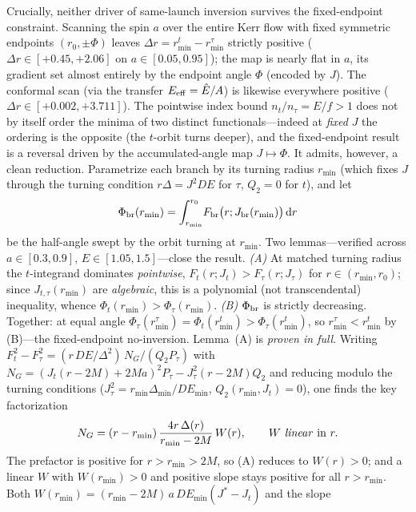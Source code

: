 \documentclass[12pt]{iopart}
\theoremstyle{plain}
\theoremstyle{definition}
\theoremstyle{remark}
\newcommand{\dd}{\mathrm{d}}
\begin{document}
Crucially, neither driver of same-launch inversion survives the
fixed-endpoint constraint. Scanning the spin $a$ over the entire
Kerr flow with fixed symmetric endpoints $(r_0,\pm\Phi)$ leaves
$\Delta r=r_{\min}^t-r_{\min}^\tau$ strictly positive
($\Delta r\in[+0.45,+2.06]$ on $a\in[0.05,0.95]$); the map is nearly flat
in $a$, its gradient set almost entirely by the endpoint angle
$\Phi$ (encoded by $J$). The conformal scan (via the transfer
$E_{\rm eff}=\hat E/A$) is likewise everywhere positive
($\Delta r\in[+0.002,+3.711]$). The pointwise index bound $n_t/n_\tau=E/f>1$ does
not by itself order the minima of two distinct functionals---indeed at \emph{fixed}
$J$ the ordering is the opposite (the $t$-orbit turns deeper), and the fixed-endpoint
result is a reversal driven by the accumulated-angle map $J\mapsto\Phi$. It admits,
however, a clean reduction. Parametrize each branch by its turning radius $r_{\min}$
(which fixes $J$ through the turning condition $r\Delta=J^2 DE$ for $\tau$, $Q_2=0$
for $t$), and let
\begin{equation}
    \Phi_{\rm br}(r_{\min})=\int_{r_{\min}}^{r_0}\!F_{\rm br}\big(r;J_{\rm br}(r_{\min})\big)\,\dd r
\end{equation}
be the half-angle swept by the orbit turning at $r_{\min}$. Two lemmas---verified
across $a\in[0.3,0.9]$, $E\in[1.05,1.5]$---close the result. \emph{(A)} At matched
turning radius the $t$-integrand dominates \emph{pointwise},
$F_t(r;J_t)>F_\tau(r;J_\tau)$ for $r\in(r_{\min},r_0)$; since $J_{t,\tau}(r_{\min})$
are \emph{algebraic}, this is a polynomial (not transcendental) inequality, whence
$\Phi_t(r_{\min})>\Phi_\tau(r_{\min})$. \emph{(B)} $\Phi_{\rm br}$ is strictly
decreasing. Together: at equal angle
$\Phi_\tau(r_{\min}^\tau)=\Phi_t(r_{\min}^t)>\Phi_\tau(r_{\min}^t)$, so
$r_{\min}^\tau<r_{\min}^t$ by (B)---the fixed-endpoint no-inversion. Lemma~(A) is
\emph{proven in full}. Writing $F_t^2-F_\tau^2=(r\,DE/\Delta^2)\,N_G/(Q_2 P_\tau)$
with $N_G=(J_t(r-2M)+2Ma)^2 P_\tau-J_\tau^2(r-2M)Q_2$ and reducing modulo the turning
conditions ($J_\tau^2=r_{\min}\Delta_{\min}/DE_{\min}$, $Q_2(r_{\min},J_t)=0$), one
finds the key factorization
\begin{equation}
    N_G=(r-r_{\min})\,\frac{4r\,\Delta(r)}{r_{\min}-2M}\,W(r),\qquad W\ \text{\emph{linear} in }r .
\end{equation}
The prefactor is positive for $r>r_{\min}>2M$, so (A) reduces to $W(r)>0$; and a
linear $W$ with $W(r_{\min})>0$ and positive slope stays positive for all
$r>r_{\min}$. Both $W(r_{\min})=(r_{\min}-2M)\,a\,DE_{\min}(J^\ast-J_t)$ and the slope
\end{document}
